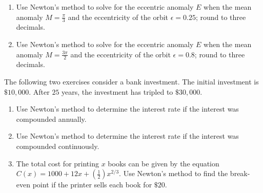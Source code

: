 \documentclass{exercises}
\begin{document}
\begin{enumerate}[resume]
\item Use Newton's method to solve for the eccentric anomaly $E$ when the mean anomaly $M=\frac{\pi}{3}$ and the eccentricity of the orbit $\epsilon=0.25$; round to three decimals.
\item Use Newton's method to solve for the eccentric anomaly $E$ when the mean anomaly $M=\frac{3\pi}{2}$ and the eccentricity of the orbit $\epsilon=0.8$; round to three decimals.
\end{enumerate}

The following two exercises consider a bank investment. The initial investment is $\$10{,}000$. After $25$ years, the investment has tripled to $\$30{,}000$.

\begin{enumerate}[resume]
\item Use Newton's method to determine the interest rate if the interest was compounded annually.
\item Use Newton's method to determine the interest rate if the interest was compounded continuously.
\item The total cost for printing $x$ books can be given by the equation $C(x)=1000+12x+(\frac{1}{2})x^{2/3}$. Use Newton's method to find the break-even point if the printer sells each book for $\$20$.
\end{enumerate}
\end{document}
